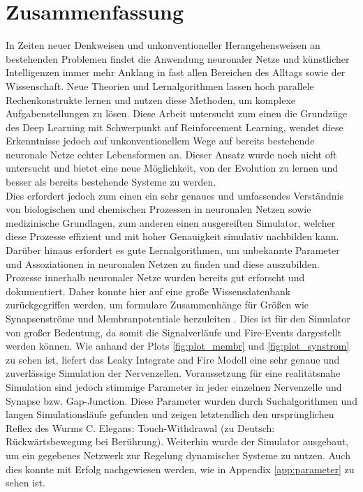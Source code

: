 \section{Zusammenfassung}
\label{sec:erg_zsm}
	In Zeiten neuer Denkweisen und unkonventioneller Herangehensweisen an bestehenden Problemen findet die Anwendung neuronaler Netze und künstlicher Intelligenzen immer mehr Anklang in fast allen Bereichen des Alltags sowie der Wissenschaft. Neue Theorien und Lernalgorithmen lassen hoch parallele Rechenkonstrukte lernen und nutzen diese Methoden, um komplexe Aufgabenstellungen zu lösen. Diese Arbeit untersucht zum einen die Grundzüge des Deep Learning mit Schwerpunkt auf Reinforcement Learning, wendet diese Erkenntnisse jedoch auf unkonventionellem Wege auf bereits bestehende neuronale Netze echter Lebensformen an. Dieser Ansatz wurde noch nicht oft untersucht und bietet eine neue Möglichkeit, von der Evolution zu lernen und besser als bereits bestehende Systeme zu werden.\\
	Dies erfordert jedoch zum einen ein sehr genaues und umfassendes Verständnis von biologischen und chemischen Prozessen in neuronalen Netzen sowie medizinische Grundlagen, zum anderen einen ausgereiften Simulator, welcher diese Prozesse effizient und mit hoher Genauigkeit simulativ nachbilden kann. Darüber hinaus erfordert es gute Lernalgorithmen, um unbekannte Parameter und Assoziationen in neuronalen Netzen zu finden und diese auszubilden.\\
	Prozesse innerhalb neuronaler Netze wurden bereits gut erforscht und dokumentiert. Daher konnte hier auf eine große Wissensdatenbank zurückgegriffen werden, um formulare Zusammenhänge für Größen wie Synapsenströme und Membranpotentiale herzuleiten \cite{NeuronalDynamics}. Dies ist für den Simulator von großer Bedeutung, da somit die Signalverläufe und Fire-Events dargestellt werden können. Wie anhand der Plots \ref{fig:plot_membr} und \ref{fig:plot_synstrom} zu sehen ist, liefert das Leaky Integrate and Fire Modell eine sehr genaue und zuverlässige Simulation der Nervenzellen. Voraussetzung für eine realitätsnahe Simulation sind jedoch stimmige Parameter in jeder einzelnen Nervenzelle und Synapse bzw. Gap-Junction. Diese Parameter wurden durch Suchalgorithmen und langen Simulationsläufe gefunden und zeigen letztendlich den ursprünglichen Reflex des Wurms C. Elegans: Touch-Withdrawal (zu Deutsch: Rückwärtsbewegung bei Berührung). Weiterhin wurde der Simulator ausgebaut, um ein gegebenes Netzwerk zur Regelung dynamischer Systeme zu nutzen. Auch dies konnte mit Erfolg nachgewiesen werden, wie in Appendix \ref{app:parameter} zu sehen ist.\\
